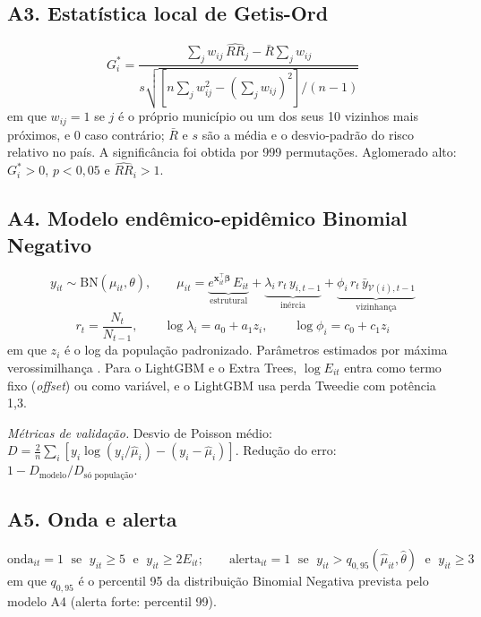 \documentclass[12pt]{article}
\begin{document}
\subsection*{A3. Estatística local de Getis-Ord}
\begin{equation*}
G_i^{*} = \frac{\sum_{j} w_{ij}\, \widehat{RR}_j - \bar{R}\sum_j w_{ij}}{s\sqrt{\left[n\sum_j w_{ij}^2 - \left(\sum_j w_{ij}\right)^2\right]/(n-1)}}
\end{equation*}
em que $w_{ij}=1$ se $j$ é o próprio município ou um dos seus 10 vizinhos mais próximos, e 0 caso contrário; $\bar{R}$ e $s$ são a média e o desvio-padrão do risco relativo no país. A significância foi obtida por 999 permutações. Aglomerado alto: $G_i^{*}>0$, $p<0{,}05$ e $\widehat{RR}_i>1$.

\subsection*{A4. Modelo endêmico-epidêmico Binomial Negativo}
\begin{equation*}
y_{it} \sim \text{BN}(\mu_{it}, \theta), \qquad
\mu_{it} = \underbrace{e^{\mathbf{x}_{it}^{\top}\boldsymbol{\beta}}\, E_{it}}_{\text{estrutural}}
+ \underbrace{\lambda_i\, r_t\, y_{i,t-1}}_{\text{inércia}}
+ \underbrace{\phi_i\, r_t\, \bar{y}_{\mathcal{V}(i),t-1}}_{\text{vizinhança}}
\end{equation*}
\begin{equation*}
r_t = \frac{N_t}{N_{t-1}}, \qquad \log\lambda_i = a_0 + a_1 z_i, \qquad \log\phi_i = c_0 + c_1 z_i
\end{equation*}
em que $z_i$ é o log da população padronizado. Parâmetros estimados por máxima verossimilhança \cite{held_hohle_hofmann:2005}. Para o LightGBM e o Extra Trees, $\log E_{it}$ entra como termo fixo (\textit{offset}) ou como variável, e o LightGBM usa perda Tweedie com potência 1,3.

\textit{Métricas de validação.} Desvio de Poisson médio: $D = \frac{2}{n}\sum_i \left[y_i \log(y_i/\hat{\mu}_i) - (y_i-\hat{\mu}_i)\right]$. Redução do erro: $1 - D_{\text{modelo}}/D_{\text{só população}}$.

\subsection*{A5. Onda e alerta}
\begin{equation*}
\text{onda}_{it} = 1 \;\text{ se }\; y_{it} \ge 5 \;\text{ e }\; y_{it} \ge 2E_{it}; \qquad
\text{alerta}_{it} = 1 \;\text{ se }\; y_{it} > q_{0,95}(\hat{\mu}_{it}, \hat{\theta}) \;\text{ e }\; y_{it} \ge 3
\end{equation*}
em que $q_{0,95}$ é o percentil 95 da distribuição Binomial Negativa prevista pelo modelo A4 (alerta forte: percentil 99).
\end{document}
